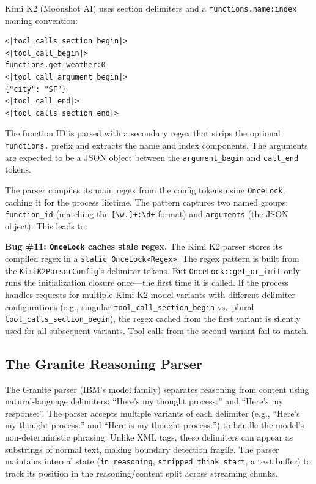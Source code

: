 Kimi K2 (Moonshot AI) uses section delimiters and a \texttt{functions.name:index} naming convention:

\begin{verbatim}
<|tool_calls_section_begin|>
<|tool_call_begin|>
functions.get_weather:0
<|tool_call_argument_begin|>
{"city": "SF"}
<|tool_call_end|>
<|tool_calls_section_end|>
\end{verbatim}

The function ID is parsed with a secondary regex that strips the optional \texttt{functions.} prefix and extracts the name and index components. The arguments are expected to be a JSON object between the \texttt{argument\_begin} and \texttt{call\_end} tokens.

The parser compiles its main regex from the config tokens using \texttt{OnceLock}, caching it for the process lifetime. The pattern captures two named groups: \texttt{function\_id} (matching the \texttt{[\textbackslash w.]+:\textbackslash d+} format) and \texttt{arguments} (the JSON object). This leads to:

\begin{bugbox}
\textbf{Bug \#11: \texttt{OnceLock} caches stale regex.} The Kimi K2 parser stores its compiled regex in a \texttt{static OnceLock<Regex>}. The regex pattern is built from the \texttt{KimiK2ParserConfig}'s delimiter tokens. But \texttt{OnceLock::get\_or\_init} only runs the initialization closure once---the first time it is called. If the process handles requests for multiple Kimi K2 model variants with different delimiter configurations (e.g., singular \texttt{tool\_call\_section\_begin} vs.\ plural \texttt{tool\_calls\_section\_begin}), the regex cached from the first variant is silently used for all subsequent variants. Tool calls from the second variant fail to match.
\end{bugbox}

\subsection{The Granite Reasoning Parser}

%
The Granite parser (IBM's model family) separates reasoning from content using natural-language delimiters: ``Here's my thought process:'' and ``Here's my response:''. The parser accepts multiple variants of each delimiter (e.g., ``Here's my thought process:'' and ``Here is my thought process:'') to handle the model's non-deterministic phrasing. Unlike XML tags, these delimiters can appear as substrings of normal text, making boundary detection fragile. The parser maintains internal state (\texttt{in\_reasoning}, \texttt{stripped\_think\_start}, a text buffer) to track its position in the reasoning/content split across streaming chunks.


